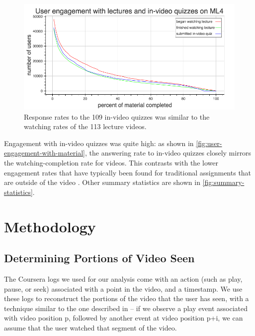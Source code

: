 \documentclass{sigchi}
\begin{document}
\begin{figure}
\includegraphics[width=1.0\columnwidth]{user-engagement-with-material}
\caption{Response rates to the 109 in-video quizzes was similar to the watching rates of the 113 lecture videos.}
\label{fig:user-engagement-with-material}
\end{figure}

Engagement with in-video quizzes was quite high: as shown in \autoref{fig:user-engagement-with-material}, the answering rate to in-video quizzes closely mirrors the watching-completion rate for videos. This contrasts with the lower engagement rates that have typically been found for traditional assignments that are outside of the video \cite{renedisengagement} \cite{ashton}. Other summary statistics are shown in \autoref{fig:summary-statistics}.


\section{Methodology}

\subsection{Determining Portions of Video Seen}

The Coursera logs we used for our analysis come with an action (such as play, pause, or seek) associated with a point in the video, and a timestamp. We use these logs to reconstruct the portions of the video that the user has seen, with a technique similar to the one described in \cite{juho} -- if we observe a play event associated with video position p, followed by another event at video position p+i, we can assume that the user watched that segment of the video.
\end{document}
